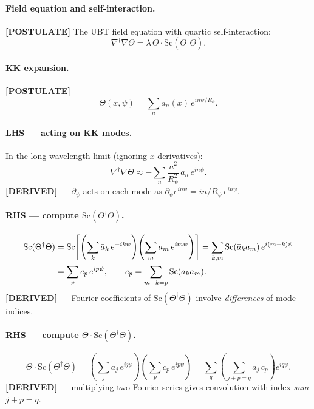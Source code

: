 \paragraph{Field equation and self-interaction.}
\textbf{[POSTULATE]} The UBT field equation with quartic self-interaction:
\begin{equation}
  \nabla^\dagger\nabla\Theta = \lambda\,\Theta\cdot\mathrm{Sc}(\Theta^\dagger\Theta).
  \label{eq:UBT-field-eq}
\end{equation}

\paragraph{KK expansion.}  \textbf{[POSTULATE]}
\begin{equation}
  \Theta(x,\psi) = \sum_n a_n(x)\,e^{in\psi/R_\psi}.
  \label{eq:KK-expansion}
\end{equation}

\paragraph{LHS — acting on KK modes.}  In the long-wavelength limit (ignoring
$x$-derivatives):
\begin{equation}
  \nabla^\dagger\nabla\Theta \approx -\sum_n \frac{n^2}{R_\psi^2}\,a_n\,e^{in\psi}.
  \label{eq:LHS-KK}
\end{equation}
\textbf{[DERIVED]} — $\partial_\psi$ acts on each mode as $\partial_\psi e^{in\psi} = in/R_\psi\,e^{in\psi}$.

\paragraph{RHS — compute $\mathrm{Sc}(\Theta^\dagger\Theta)$.}
\begin{align}
  \mathrm{Sc}(\Theta^\dagger\Theta)
  &= \mathrm{Sc}\!\left[\left(\sum_k \bar{a}_k\,e^{-ik\psi}\right)\!\left(\sum_m a_m\,e^{im\psi}\right)\right]
  = \sum_{k,m} \mathrm{Sc}(\bar{a}_k a_m)\,e^{i(m-k)\psi} \notag \\
  &= \sum_p c_p\,e^{ip\psi}, \qquad
    c_p = \sum_{m-k=p}\mathrm{Sc}(\bar{a}_k a_m).
  \label{eq:Sc-KK}
\end{align}
\textbf{[DERIVED]} — Fourier coefficients of $\mathrm{Sc}(\Theta^\dagger\Theta)$
involve \emph{differences} of mode indices.

\paragraph{RHS — compute $\Theta\cdot\mathrm{Sc}(\Theta^\dagger\Theta)$.}
\begin{equation}
  \Theta\cdot\mathrm{Sc}(\Theta^\dagger\Theta)
  = \left(\sum_j a_j\,e^{ij\psi}\right)\left(\sum_p c_p\,e^{ip\psi}\right)
  = \sum_q\left(\sum_{j+p=q} a_j\,c_p\right)e^{iq\psi}.
  \label{eq:RHS-KK}
\end{equation}
\textbf{[DERIVED]} — multiplying two Fourier series gives convolution with
index \emph{sum} $j + p = q$.

